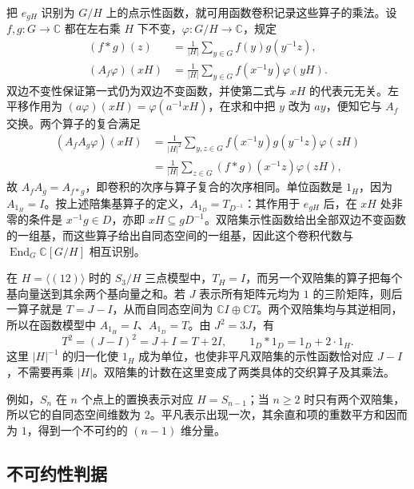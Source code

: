 把 \(e_{gH}\) 识别为 \(G/H\) 上的点示性函数，就可用函数卷积记录这些算子的乘法。设 \(f,g:G\to\mathbb C\) 都在左右乘 \(H\) 下不变，\(\varphi:G/H\to\mathbb C\)，规定
\begin{equation}\label{b5:eq:finite-hecke-convolution-action}
	\begin{aligned}
		(f*g)(z)&=\frac1{|H|}\sum_{y\in G}f(y)g(y^{-1}z),\\
		(A_f\varphi)(xH)&=\frac1{|H|}\sum_{y\in G}f(x^{-1}y)\varphi(yH).
	\end{aligned}
\end{equation}
双边不变性保证第一式仍为双边不变函数，并使第二式与 \(xH\) 的代表元无关。左平移作用为 \((a\varphi)(xH)=\varphi(a^{-1}xH)\)，在求和中把 \(y\) 改为 \(ay\)，便知它与 \(A_f\) 交换。两个算子的复合满足
\[
	\begin{aligned}
		(A_fA_g\varphi)(xH) &=\frac1{|H|^2}\sum_{y,z\in G}f(x^{-1}y)g(y^{-1}z)\varphi(zH)\\
		&=\frac1{|H|}\sum_{z\in G}(f*g)(x^{-1}z)\varphi(zH),
	\end{aligned}
\]
故 \(A_fA_g=A_{f*g}\)，即卷积的次序与算子复合的次序相同。单位函数是 \(1_H\)，因为 \(A_{1_H}=I\)。按上述陪集基算子的定义，\(A_{1_D}=T_{D^{-1}}\)：其作用于 \(e_{gH}\) 后，在 \(xH\) 处非零的条件是 \(x^{-1}g\in D\)，亦即 \(xH\subseteq gD^{-1}\)。双陪集示性函数给出全部双边不变函数的一组基，而这些算子给出自同态空间的一组基，因此这个卷积代数与 \(\operatorname{End}_G\mathbb C[G/H]\) 相互识别。

\ProseParagraphBreak

在 \(H=\langle(12)\rangle\) 时的 \(S_3/H\) 三点模型中，\(T_H=I\)，而另一个双陪集的算子把每个基向量送到其余两个基向量之和。若 \(J\) 表示所有矩阵元均为 \(1\) 的三阶矩阵，则后一算子就是 \(T=J-I\)，从而自同态空间为 \(\mathbb CI\oplus\mathbb CT\)。两个双陪集均与其逆相同，所以在函数模型中 \(A_{1_H}=I\)、\(A_{1_D}=T\)。由 \(J^2=3J\)，有
\[
	T^2=(J-I)^2=J+I=T+2I, \qquad 1_D*1_D=1_D+2\cdot1_H.
\]
这里 \(|H|^{-1}\) 的归一化使 \(1_H\) 成为单位，也使非平凡双陪集的示性函数恰对应 \(J-I\)，不需要再乘 \(|H|\)。双陪集的计数在这里变成了两类具体的交织算子及其乘法。

\ProseParagraphBreak

例如，\(S_n\) 在 \(n\) 个点上的置换表示对应 \(H=S_{n-1}\)；当 \(n\geq2\) 时只有两个双陪集，所以它的自同态空间维数为 \(2\)。平凡表示出现一次，其余直和项的重数平方和因而为 \(1\)，得到一个不可约的 \((n-1)\) 维分量。

\subsection{不可约性判据}
\label{b5:subsec:0402:03}

